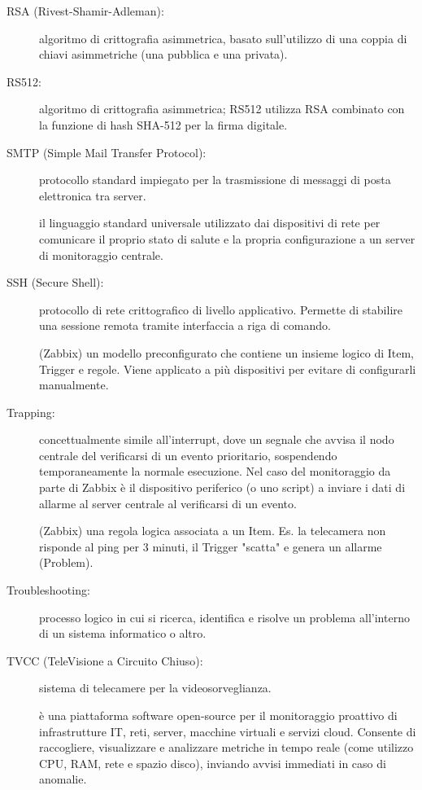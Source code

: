 \documentclass[12pt, a4paper, oneside]{report}
\begin{document}
\begin{description}
    \item[RSA (Rivest-Shamir-Adleman):] algoritmo di crittografia asimmetrica, basato sull'utilizzo di una coppia di chiavi asimmetriche (una pubblica e una privata).
    \item[RS512:] algoritmo di crittografia asimmetrica; RS512 utilizza RSA combinato con la funzione di hash SHA-512 per la firma digitale.
    \item[SMTP (Simple Mail Transfer Protocol):] protocollo standard impiegato per la trasmissione di messaggi di posta elettronica tra server.
    \item[\hypertarget{glo:snmp}SNMP (Simple Network Management Protocol):] il linguaggio standard universale utilizzato dai dispositivi di rete per comunicare il proprio stato di salute e la propria configurazione a un server di monitoraggio centrale.
    \item[SSH (Secure Shell):] protocollo di rete crittografico di livello applicativo. Permette di stabilire una sessione remota tramite interfaccia a riga di comando.
    \item[\hypertarget{glo:template}Template:] (Zabbix) un modello preconfigurato che contiene un insieme logico di Item, Trigger e regole. Viene applicato a più dispositivi per evitare di configurarli manualmente.
    \item[Trapping:] concettualmente simile all'interrupt, dove un segnale che avvisa il nodo centrale del verificarsi di un evento prioritario, sospendendo temporaneamente la normale esecuzione. Nel caso del monitoraggio da parte di Zabbix è il dispositivo periferico (o uno script) a inviare i dati di allarme al server centrale al verificarsi di un evento.
    \item[\hypertarget{glo:trigger}Trigger:] (Zabbix) una regola logica associata a un Item. Es. la telecamera non risponde al ping per 3 minuti, il Trigger "scatta" e genera un allarme (Problem).
    \item[Troubleshooting:] processo logico in cui si ricerca, identifica e risolve un problema all'interno di un sistema informatico o altro.
    \item[TVCC (TeleVisione a Circuito Chiuso):] sistema di telecamere per la videosorveglianza.
    \item[\hypertarget{glo:Zabbix}Zabbix:] è una piattaforma software open-source per il monitoraggio proattivo di infrastrutture IT, reti, server, macchine virtuali e servizi cloud. Consente di raccogliere, visualizzare e analizzare metriche in tempo reale (come utilizzo CPU, RAM, rete e spazio disco), inviando avvisi immediati in caso di anomalie.

\end{description}
\end{document}
